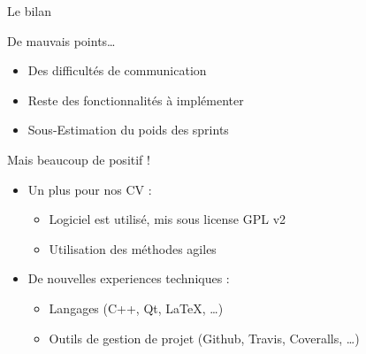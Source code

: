 \CedricSpeak{}
\begin{frame}{Le bilan} %
	\begin{alertblock}{De mauvais points…}
		\begin{itemize}
			\item Des difficultés de communication
			\item Reste des fonctionnalités à implémenter 
			\item Sous-Estimation du poids des sprints 
		\end{itemize}
	\end{alertblock}
	\vfill
	\pause
	\begin{exampleblock}{Mais beaucoup de positif !}
		\begin{itemize}
			\item Un plus pour nos CV :
				\begin{itemize}
					\item Logiciel est utilisé, mis sous license GPL v2
					\item Utilisation des méthodes agiles
				\end{itemize}
	
			\item De nouvelles experiences techniques :
				\begin{itemize}
					\item Langages (C++, Qt, \LaTeX{}, \ldots)
					\item Outils de gestion de projet (Github, Travis, Coveralls, \ldots)
				\end{itemize}
		\end{itemize}
	\end{exampleblock}

	\vfill
\end{frame}

